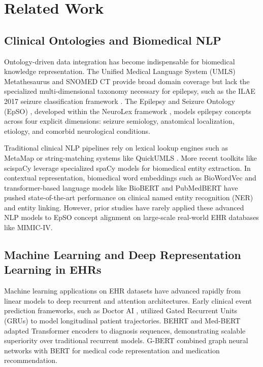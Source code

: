 \documentclass[11pt,a4paper]{article}
\begin{document}
\section{Related Work}

\subsection{Clinical Ontologies and Biomedical NLP}
Ontology-driven data integration has become indispensable for biomedical knowledge representation. The Unified Medical Language System (UMLS) Metathesaurus \cite{bodenreider2004unified} and SNOMED CT provide broad domain coverage but lack the specialized multi-dimensional taxonomy necessary for epilepsy, such as the ILAE 2017 seizure classification framework \cite{fisher2017operational}. The Epilepsy and Seizure Ontology (EpSO) \cite{buccella2011ontology}, developed within the NeuroLex framework \cite{larson2013neurolex}, models epilepsy concepts across four explicit dimensions: seizure semiology, anatomical localization, etiology, and comorbid neurological conditions. 

Traditional clinical NLP pipelines rely on lexical lookup engines such as MetaMap \cite{aronson2001overview} or string-matching systems like QuickUMLS \cite{soldaini2016quickumls}. More recent toolkits like scispaCy \cite{neumann2019scispacy} leverage specialized spaCy models for biomedical entity extraction. In contextual representation, biomedical word embeddings such as BioWordVec \cite{zhang2019biowordvec} and transformer-based language models like BioBERT \cite{lee2020biobert} and PubMedBERT \cite{gu2021domain} have pushed state-of-the-art performance on clinical named entity recognition (NER) and entity linking. However, prior studies have rarely applied these advanced NLP models to EpSO concept alignment on large-scale real-world EHR databases like MIMIC-IV.

\subsection{Machine Learning and Deep Representation Learning in EHRs}
Machine learning applications on EHR datasets have advanced rapidly from linear models to deep recurrent and attention architectures. Early clinical event prediction frameworks, such as Doctor AI \cite{choi2016doctor}, utilized Gated Recurrent Units (GRUs) to model longitudinal patient trajectories. BEHRT \cite{li2020behrt} and Med-BERT \cite{rasmy2021med} adapted Transformer encoders to diagnosis sequences, demonstrating scalable superiority over traditional recurrent models. G-BERT \cite{shang2019pre} combined graph neural networks with BERT for medical code representation and medication recommendation.
\end{document}

